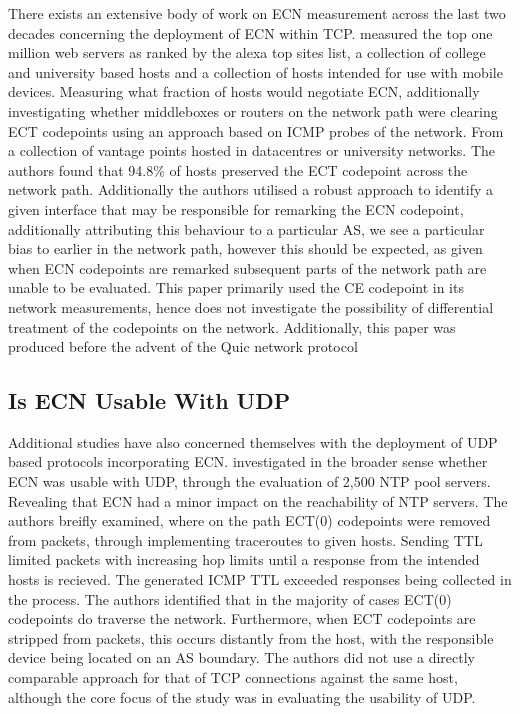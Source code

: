 \documentclass{l4proj}
\begin{document}
There exists an extensive body of work on ECN measurement across the last two decades concerning the deployment of ECN within TCP. \cite{bauer_measuring_2011} measured the top one million web servers as ranked by the alexa top sites list, a collection of college and university based hosts and a collection of hosts intended for use with mobile devices. Measuring what fraction of hosts would negotiate ECN, additionally investigating whether middleboxes or routers on the network path were clearing ECT codepoints using an approach based on ICMP probes of the network. From a collection of vantage points hosted in datacentres or university networks. The authors found that 94.8\% of hosts preserved the ECT codepoint across the network path. Additionally the authors utilised a robust approach to identify a given interface that may be responsible for remarking the ECN codepoint, additionally attributing this behaviour to a particular AS, we see a particular bias to earlier in the network path, however this should be expected, as given when ECN codepoints are remarked subsequent parts of the network path are unable to be evaluated. This paper primarily used the CE codepoint in its network measurements, hence does not investigate the possibility of differential treatment of the codepoints on the network. Additionally, this paper was produced before the advent of the Quic network protocol


\subsection{Is ECN Usable With UDP}

Additional studies have also concerned themselves with the deployment of UDP based protocols incorporating ECN. \cite{mcquistin_is_2015} investigated in the broader sense whether ECN was usable with UDP, through the evaluation of 2,500 NTP pool servers. Revealing that ECN had a minor impact on the reachability of NTP servers. The authors breifly examined, where on the path ECT(0) codepoints were removed from packets, through implementing traceroutes to given hosts. Sending TTL limited packets with increasing hop limits until a response from the intended hosts is recieved. The generated ICMP TTL exceeded responses being collected in the process. The authors identified that in the majority of cases ECT(0) codepoints do traverse the network. Furthermore, when ECT codepoints are stripped from packets, this occurs distantly from the host, with the responsible device being located on an AS boundary. The authors did not use a directly comparable approach for that of TCP connections against the same host, although the core focus of the study was in evaluating the usability of UDP.
\end{document}
